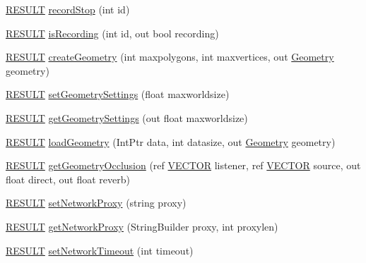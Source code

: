 \begin{DoxyCompactItemize}
\item 
\hyperlink{namespace_f_m_o_d_a305d1176ef3f8c8815861a60407ac33d}{R\+E\+S\+U\+LT} \hyperlink{class_f_m_o_d_1_1_system_a3bcaa11910d6cb451120b6bc793d8a20}{record\+Stop} (int id)
\item 
\hyperlink{namespace_f_m_o_d_a305d1176ef3f8c8815861a60407ac33d}{R\+E\+S\+U\+LT} \hyperlink{class_f_m_o_d_1_1_system_a8361e335441c2eb6dac2c2e5a0ce8896}{is\+Recording} (int id, out bool recording)
\item 
\hyperlink{namespace_f_m_o_d_a305d1176ef3f8c8815861a60407ac33d}{R\+E\+S\+U\+LT} \hyperlink{class_f_m_o_d_1_1_system_ac6fcb87f4a5eb35c8ef19eb94902b548}{create\+Geometry} (int maxpolygons, int maxvertices, out \hyperlink{class_f_m_o_d_1_1_geometry}{Geometry} geometry)
\item 
\hyperlink{namespace_f_m_o_d_a305d1176ef3f8c8815861a60407ac33d}{R\+E\+S\+U\+LT} \hyperlink{class_f_m_o_d_1_1_system_ae1d0bd2b1542fbcd01621e92103e48f4}{set\+Geometry\+Settings} (float maxworldsize)
\item 
\hyperlink{namespace_f_m_o_d_a305d1176ef3f8c8815861a60407ac33d}{R\+E\+S\+U\+LT} \hyperlink{class_f_m_o_d_1_1_system_a0bbb002848afa1a5e12553b2cb5ef6c5}{get\+Geometry\+Settings} (out float maxworldsize)
\item 
\hyperlink{namespace_f_m_o_d_a305d1176ef3f8c8815861a60407ac33d}{R\+E\+S\+U\+LT} \hyperlink{class_f_m_o_d_1_1_system_abe272d976974e84f3815bcd7f859a1cc}{load\+Geometry} (Int\+Ptr data, int datasize, out \hyperlink{class_f_m_o_d_1_1_geometry}{Geometry} geometry)
\item 
\hyperlink{namespace_f_m_o_d_a305d1176ef3f8c8815861a60407ac33d}{R\+E\+S\+U\+LT} \hyperlink{class_f_m_o_d_1_1_system_a49de01f4b3165fec74fef4f865dd16c5}{get\+Geometry\+Occlusion} (ref \hyperlink{struct_f_m_o_d_1_1_v_e_c_t_o_r}{V\+E\+C\+T\+OR} listener, ref \hyperlink{struct_f_m_o_d_1_1_v_e_c_t_o_r}{V\+E\+C\+T\+OR} source, out float direct, out float reverb)
\item 
\hyperlink{namespace_f_m_o_d_a305d1176ef3f8c8815861a60407ac33d}{R\+E\+S\+U\+LT} \hyperlink{class_f_m_o_d_1_1_system_ae1a29c1a626acef24838e5f4048902fa}{set\+Network\+Proxy} (string proxy)
\item 
\hyperlink{namespace_f_m_o_d_a305d1176ef3f8c8815861a60407ac33d}{R\+E\+S\+U\+LT} \hyperlink{class_f_m_o_d_1_1_system_a6a4082919f21874283d8df6280032798}{get\+Network\+Proxy} (String\+Builder proxy, int proxylen)
\item 
\hyperlink{namespace_f_m_o_d_a305d1176ef3f8c8815861a60407ac33d}{R\+E\+S\+U\+LT} \hyperlink{class_f_m_o_d_1_1_system_a96ffbfaa42b4cc5733700e769a61f360}{set\+Network\+Timeout} (int timeout)

\end{DoxyCompactItemize}

